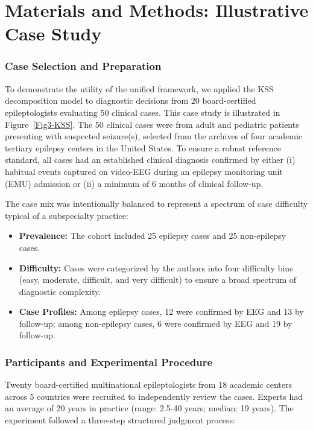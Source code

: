 
\section*{Materials and Methods: Illustrative Case Study}

\subsubsection*{Case Selection and Preparation}

To demonstrate the utility of the unified framework, we applied the KSS decomposition model to diagnostic decisions from 20 board-certified epileptologists evaluating 50 clinical cases. This case study is illustrated in Figure~\ref{Fig3-KSS}. The 50 clinical cases were from adult and pediatric patients presenting with suspected seizure(s), selected from the archives of four academic tertiary epilepsy centers in the United States. To ensure a robust reference standard, all cases had an established clinical diagnosis confirmed by either (i) habitual events captured on video-EEG during an epilepsy monitoring unit (EMU) admission or (ii) a minimum of 6 months of clinical follow-up.

The case mix was intentionally balanced to represent a spectrum of case difficulty typical of a subspecialty practice:
\begin{itemize}
    \item \textbf{Prevalence:} The cohort included 25 epilepsy cases and 25 non-epilepsy cases.
    \item \textbf{Difficulty:} Cases were categorized by the authors into four difficulty bins (easy, moderate, difficult, and very difficult) to ensure a broad spectrum of diagnostic complexity.
    \item \textbf{Case Profiles:} Among epilepsy cases, 12 were confirmed by EEG and 13 by follow-up; among non-epilepsy cases, 6 were confirmed by EEG and 19 by follow-up.
\end{itemize}

\subsubsection*{Participants and Experimental Procedure}

Twenty board-certified multinational epileptologists from 18 academic centers across 5 countries were recruited to independently review the cases. Experts had an average of 20 years in practice (range: 2.5-40 years; median: 19 years). The experiment followed a three-step structured judgment process:

